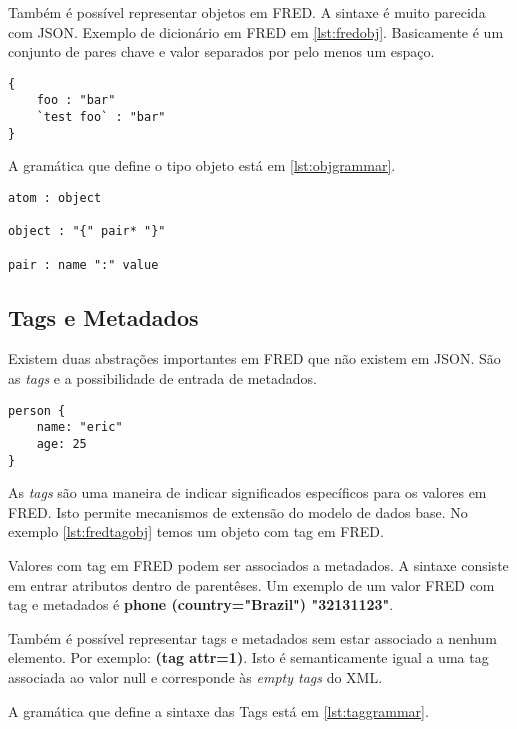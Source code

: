 Também é possível representar objetos em FRED. A sintaxe é muito parecida com JSON. 
Exemplo de dicionário em FRED em \ref{lst:fredobj}. Basicamente é um conjunto de pares 
chave e valor separados por pelo menos um espaço.

\begin{lstlisting}[caption=Exemplo de dicionário em FRED chaves com espaços são escapados com backticks,label={lst:fredobj}]
{
    foo : "bar"
    `test foo` : "bar"
}
\end{lstlisting}

A gramática que define o tipo objeto está em \ref{lst:objgrammar}.

\begin{lstlisting}[caption=Gramática para objetos,label={lst:objgrammar}]
atom : object

object : "{" pair* "}"

pair : name ":" value
\end{lstlisting}
    
\subsection{Tags e Metadados}

Existem duas abstrações importantes em FRED que não existem em JSON. São as \textit{tags} e a possibilidade de entrada 
de metadados.

\begin{lstlisting}[caption=Exemplo de dicionário com Tag em FRED,label={lst:fredtagobj}]
person {
    name: "eric"
    age: 25
}
\end{lstlisting}
    
As \textit{tags} são uma maneira de indicar significados específicos para os valores em FRED. Isto permite
mecanismos de extensão do modelo de dados base. No exemplo \ref{lst:fredtagobj} 
temos um objeto com tag em FRED.

Valores com tag em FRED podem ser associados a metadados. A sintaxe consiste em entrar 
atributos dentro de parentêses. Um exemplo de um valor FRED com tag e metadados 
é \textbf{phone (country="Brazil") "32131123"}.

Também é possível representar tags e metadados sem estar associado a nenhum elemento. 
Por exemplo: \textbf{(tag attr=1)}. Isto é semanticamente igual a uma tag associada ao valor null
e corresponde às \textit{empty tags} do XML.

A gramática que define a sintaxe das Tags está em \ref{lst:taggrammar}.

